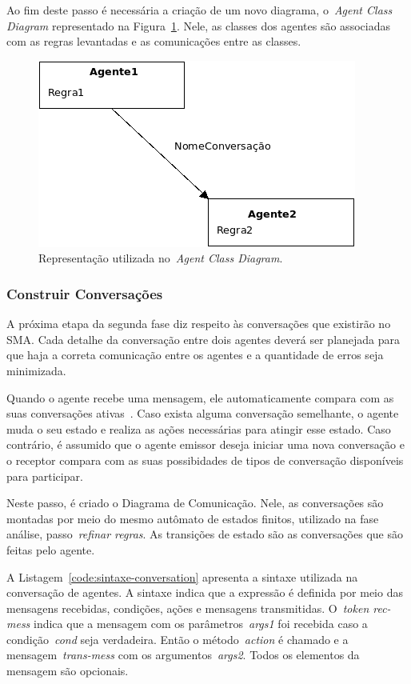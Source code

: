 Ao fim deste passo é necessária a criação de um novo diagrama, o~\emph{Agent Class Diagram} representado na Figura~\ref{fig:exemplo-agent-class-diagram}. Nele, as classes dos agentes são associadas com as regras levantadas e as comunicações entre as classes.

\begin{figure}
	\centering
	\includegraphics[scale=0.65]{images/exemplo-agent-class-diagram.png}
	\caption{Representação utilizada no~\emph{Agent Class Diagram}.}
	\label{fig:exemplo-agent-class-diagram}
\end{figure}

\subsubsection{Construir Conversações}

A próxima etapa da segunda fase diz respeito às conversações que existirão no SMA. Cada detalhe da conversação entre dois agentes deverá ser planejada para que haja a correta comunicação entre os agentes e a quantidade de erros seja minimizada.

Quando o agente recebe uma mensagem, ele automaticamente compara com as suas conversações ativas~\cite{scott01}. Caso exista alguma conversação semelhante, o agente muda o seu estado e realiza as ações necessárias para atingir esse estado. Caso contrário, é assumido que o agente emissor deseja iniciar uma nova conversação e o receptor compara com as suas possibidades de tipos de conversação disponíveis para participar.

Neste passo, é criado o Diagrama de Comunicação. Nele, as conversações são montadas por meio do mesmo autômato de estados finitos, utilizado na fase análise, passo~\emph{refinar regras}. As transições de estado são as conversações que são feitas pelo agente.

A Listagem~\ref{code:sintaxe-conversation} apresenta a sintaxe utilizada na conversação de agentes. A sintaxe indica que a expressão é definida por meio das mensagens recebidas, condições, ações e mensagens transmitidas. O~\emph{token rec-mess} indica que a mensagem com os parâmetros~\emph{args1} foi recebida caso a condição~\emph{cond} seja verdadeira. Então o método~\emph{action} é chamado e a mensagem~\emph{trans-mess} com os argumentos~\emph{args2}. Todos os elementos da mensagem são opcionais.

